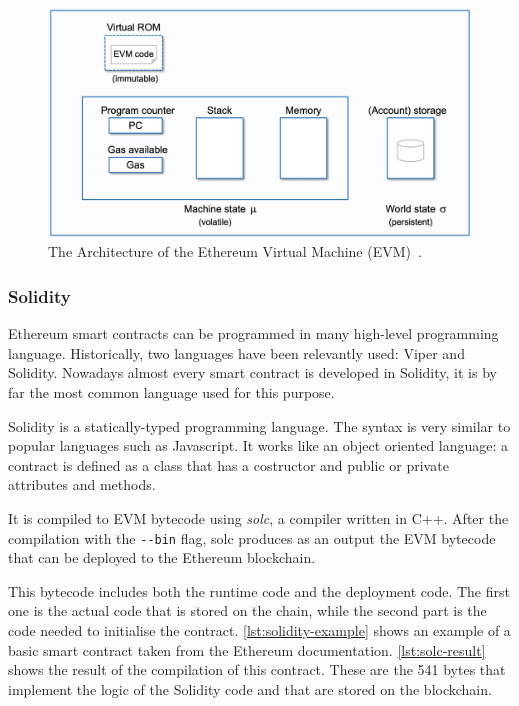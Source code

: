 \begin{figure}[!ht]
    \centering
    \includegraphics[width=1\textwidth]{Figures/background/evm.png}
    \caption{The Architecture of the Ethereum Virtual Machine (EVM)~\cite{evm-illustrated}.}
    \label{fig:evm-architecture}
\end{figure}

\subsubsection{Solidity}

Ethereum smart contracts can be programmed in many high-level programming language. Historically, two languages have been relevantly used: Viper and Solidity. Nowadays almost every smart contract is developed in Solidity, it is by far the most common language used for this purpose.

Solidity is a statically-typed programming language. The syntax is very similar to popular languages such as Javascript. It works like an object oriented language: a contract is defined as a class that has a costructor and public or private attributes and methods.

It is compiled to EVM bytecode using \textit{solc}, a compiler written in C++. After the compilation with the \lstinline{--bin} flag, solc produces as an output the EVM bytecode that can be deployed to the Ethereum blockchain.

This bytecode includes both the runtime code and the deployment code. The first one is the actual code that is stored on the chain, while the second part is the code needed to initialise the contract. \cref{lst:solidity-example} shows an example of a basic smart contract taken from the Ethereum documentation. \cref{lst:solc-result} shows the result of the compilation of this contract. These are the 541 bytes that implement the logic of the Solidity code and that are stored on the blockchain.

